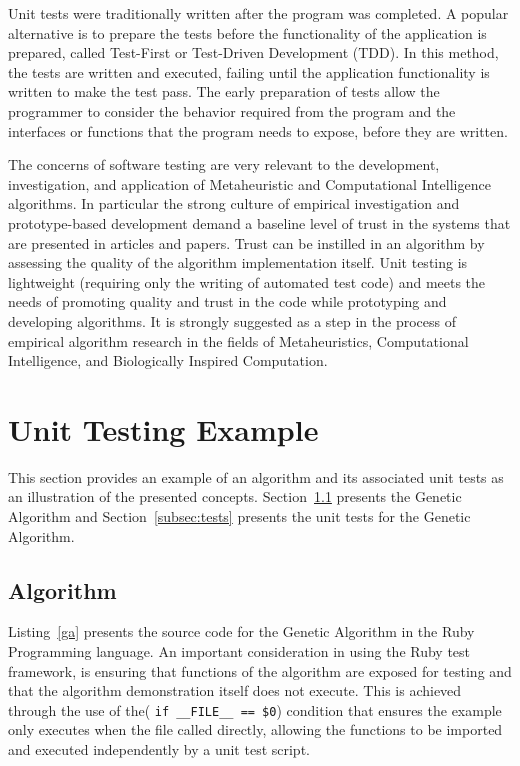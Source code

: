 \documentclass[a4paper, 11pt]{article}
\begin{document}
Unit tests were traditionally written after the program was completed. A popular alternative is to prepare the tests before the functionality of the application is prepared, called Test-First or Test-Driven Development (TDD). In this method, the tests are written and executed, failing until the application functionality is written to make the test pass. The early preparation of tests allow the programmer to consider the behavior required from the program and the interfaces or functions that the program needs to expose, before they are written. 

The concerns of software testing are very relevant to the development, investigation, and application of Metaheuristic and Computational Intelligence algorithms. In particular the strong culture of empirical investigation and prototype-based development demand a baseline level of trust in the systems that are presented in articles and papers. Trust can be instilled in an algorithm by assessing the quality of the algorithm implementation itself. 
Unit testing is lightweight (requiring only the writing of automated test code) and meets the needs of promoting quality and trust in the code while prototyping and developing algorithms. It is strongly suggested as a step in the process of empirical algorithm research in the fields of Metaheuristics, Computational Intelligence, and Biologically Inspired Computation.

%
%
\section{Unit Testing Example}
\label{sec:example}
This section provides an example of an algorithm and its associated unit tests as an illustration of the presented concepts. Section~\ref{subsec:algorithm} presents the Genetic Algorithm and Section~\ref{subsec:tests} presents the unit tests for the Genetic Algorithm.

\subsection{Algorithm}
\label{subsec:algorithm}
Listing~\ref{ga} presents the source code for the Genetic Algorithm in the Ruby Programming language. An important consideration in using the Ruby test framework, is ensuring that functions of the algorithm are exposed for testing and that the algorithm demonstration itself does not execute. This is achieved through the use of the( \texttt{if \_\_FILE\_\_ == \$0}) condition that ensures the example only executes when the file called directly, allowing the functions to be imported and executed independently by a unit test script.
\end{document}
